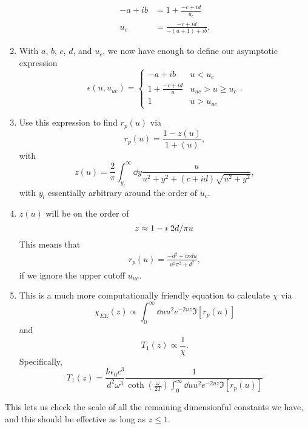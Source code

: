 \documentclass[../main.tex]{subfiles}
\begin{document}
\begin{enumerate}
\begin{align}
			-a + ib &= 1 + \frac{-c + id}{u_c} \\
			u_c &= \frac{-c + id}{-(a + 1) + ib}.
		\end{align}
		\item With $a$, $b$, $c$, $d$, and $u_c$, we now have enough to define our asymptotic expression
		\begin{equation}
			\epsilon(u, u_{uc}) =
			\begin{cases}
				-a + i b & u < u_c \\
				1 + \frac{-c + i d}{u} &  u_{uc} > u \geq u_c \\
				1 & u > u_{uc}
			\end{cases}.
		\end{equation}
		\item Use this expression to find $r_p(u)$ via
		\begin{equation}
			r_p(u) = \frac{1 - z(u)}{1 + (u)},
		\end{equation}
		with
		\begin{equation}
			z(u) = \frac{2}{\pi} \int_{y_l}^{\infty} \dd{y} \frac{u}{u^2 + y^2 + (c + i d)\sqrt{u^2 + y^2}},
		\end{equation}
		with $y_l$ essentially arbitrary around the order of $u_c$.
		\item $z(u)$ will be on the order of
		\begin{equation}
			z \approx 1 - i \flatfrac{2 d}{\pi u}
		\end{equation}
		This means that 
		\begin{align}
			r_p(u) = \frac{-d^2 + i \pi d u}{u^2 \pi^2 + d^2},
		\end{align}
		if we ignore the upper cutoff $u_{uc}$.
		\item This is a much more computationally friendly equation to calculate $\chi$ via
		\begin{equation}
			\chi_{EE}(z) \propto \int_0^\infty \dd{u} u^2 e^{-2 u z} \Im[r_p(u)]
		\end{equation}
		and
		\begin{equation}
			T_1(z) \propto \frac{1}{\chi}.
		\end{equation}
		Specifically,
		\begin{equation}
			T_1(z) = \frac{\hbar \epsilon_0 c^{3}}{d^2 \omega^3} \frac{1}{\coth(\frac{\omega}{2 T}) \int_0^\infty \dd{u} u^2 e^{-2 u z} \Im[r_p(u)]}
		\end{equation}
	\end{enumerate}
	This lets us check the scale of all the remaining dimensionful constants we have, and this should be effective as long as $z \leq 1$.
\end{document}

